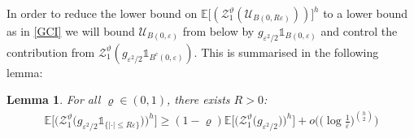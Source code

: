 \documentclass[a4paper,reqno,11pt]{amsart}
\numberwithin{equation}{section}
\theoremstyle{mytheorem}
\newtheorem{lemma}[theorem]{Lemma}
\newcommand{\bbE}{{\ensuremath{\mathbb E}} }
\newcommand{\cU}{{\ensuremath{\mathcal U}} }
\newcommand{\gt}{\vartheta}
\newcommand{\ind}{\mathds{1}}
\renewcommand{\epsilon}{\varepsilon}
\renewcommand{\rho}{\varrho}
\newcommand\qa{\bigg[}
\newcommand\qb{\bigg]}
\newcommand\ra{\left(}
\newcommand\rb{\right)}
\newcommand{\f}{\frac}
\begin{document}
{In order to reduce the lower bound on $\bbE \qa \ra \mathscr{Z}^\gt_1(\cU_{B(0,R\epsilon)}) \rb \qb ^h$ to a lower bound as in \eqref{GCI}
we will bound $\cU_{B(0,\epsilon)}$ from below by $g_{\epsilon^2/2}\ind_{B(0,\epsilon)}$ and control the contribution from $\mathscr{Z}^\gt_1 \ra g_{\epsilon^2/2}\ind_{B^c(0,\epsilon)} \rb$.  This is summarised in the following lemma:
\begin{lemma}\label{thm: outer lower bound}
    For all $\rho\in (0,1)$, there exists $R>0$:
        \begin{align}\label{eq: outer lower bound}
        \bbE  \Big[ \Big( \mathscr{Z}^\gt_1 \big( g_{\epsilon^2/2} \ind_{ \{ |\cdot| \le R \epsilon \} } \big) \Big)^h \Big] 
        \ge (1-\rho) \bbE   \Big[ \Big(\mathscr{Z}^\gt_1 \big( g_{ \epsilon^2/2 } \big) \Big)^h\Big]  +   
        o\Big( \big(\log\f{1}{\epsilon} \big)^{h\choose 2} \Big)
    \end{align}


\end{lemma}}
\end{document}
